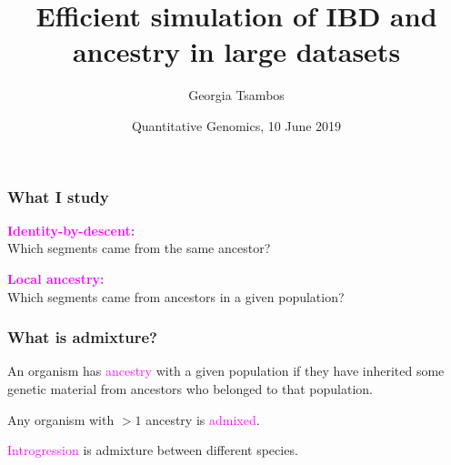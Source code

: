 \documentclass[11pt, mathserif, aspectratio=169]{beamer}
\title{Efficient simulation of IBD and ancestry in large datasets}
\author{Georgia Tsambos}
\institute{{\normalsize University of Melbourne, Australia}}
\date{Quantitative Genomics, 10 June 2019}
\newcommand{\magenta}[1]{\textcolor{magenta}{#1}}
\newenvironment{wideitemize}{\itemize\addtolength{\itemsep}{10pt}}{\enditemize}
\begin{document}

\begin{frame}
\frametitle{What I study}
\begin{minipage}{.45\linewidth}
\flushleft

\end{minipage}\hspace{1cm}\begin{minipage}{.45\linewidth}
\flushright
{\bf\magenta{Identity-by-descent:}}\\
Which segments came from the same ancestor?
\vspace{15mm}

{\bf\magenta{Local ancestry:}}\\
Which segments came from ancestors in a given population?
\end{minipage}
\end{frame}



\begin{frame}
\frametitle{What is admixture?}
%

\begin{wideitemize}
    \item An organism has \magenta{ancestry} with a given population if they have inherited some genetic material from ancestors who belonged to that population. 
    \item Any organism with $>1$ ancestry is \magenta{admixed}.
    \item \magenta{Introgression} is admixture between different species.
\end{wideitemize}

\end{frame}
\end{document}
